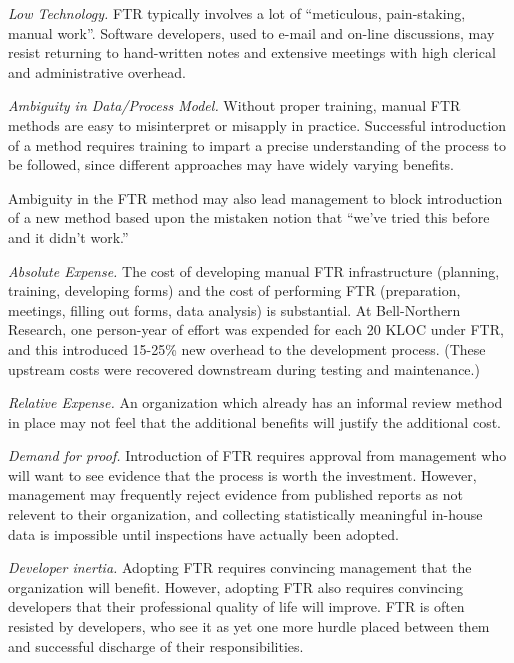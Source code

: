 \begin{itemizenoindent}

\item {\em Low Technology.}  FTR typically involves a lot of
  ``meticulous, pain-staking, manual work''.  Software developers, used
  to e-mail and on-line discussions, may resist returning to hand-written
  notes and extensive meetings with high clerical and administrative
  overhead.

\item {\em Ambiguity in Data/Process Model.}  Without proper training,
  manual FTR methods are easy to misinterpret or misapply in practice.
  Successful introduction of a method requires training to impart a
  precise understanding of the process to be followed, since different
  approaches may have widely varying benefits.
  
  Ambiguity in the FTR method may also lead management to block
  introduction of a new method based upon the mistaken notion that ``we've
  tried this before and it didn't work.''

\item {\em Absolute Expense.}  The cost of developing manual FTR
  infrastructure (planning, training, developing forms) and the cost of
  performing FTR (preparation, meetings, filling out forms, data analysis)
  is substantial.  At Bell-Northern Research, one person-year of effort was
  expended for each 20 KLOC under FTR, and this introduced
  15-25\% new overhead to the development process. (These upstream costs
  were recovered downstream during testing and maintenance.) 

\item {\em Relative Expense.}  An organization which already has an
  informal review method in place may not feel that the additional benefits
  will justify the additional cost.

\item {\em Demand for proof.}  Introduction of FTR requires approval from
  management who will want to see evidence that the process is worth the
  investment.  However, management may frequently reject evidence from
  published reports as not relevent to their organization, and collecting
  statistically meaningful in-house data is impossible until inspections
  have actually been adopted. 

\item {\em Developer inertia.}  Adopting FTR requires convincing
  management that the organization will benefit. However, adopting FTR
  also requires convincing developers that their professional quality of
  life will improve. FTR is often resisted by developers, who see it as 
  yet one more hurdle placed between them and successful discharge of their
  responsibilities. 


\end{itemizenoindent}
